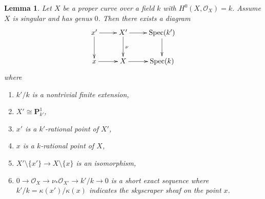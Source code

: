 \documentclass{stacks-project}
\theoremstyle{plain}
\newtheorem{lemma}[subsection]{Lemma}
\theoremstyle{definition}
\theoremstyle{remark}
\numberwithin{equation}{subsection}
\def\Spec{\mathop{\mathrm{Spec}}}
\begin{document}
\begin{lemma}
\label{lemma-genus-zero-singular}
Let $X$ be a proper curve over a field $k$ with $H^0(X, \mathcal{O}_X) = k$.
Assume $X$ is singular and has genus $0$. Then there exists a diagram
$$
\xymatrix{
x' \ar[d] \ar[r] & X' \ar[d]^\nu \ar[r] & \Spec(k') \ar[d] \\
x \ar[r] & X \ar[r] & \Spec(k)
}
$$
where
\begin{enumerate}
\item $k'/k$ is a nontrivial finite extension,
\item $X' \cong \mathbf{P}^1_{k'}$,
\item $x'$ is a $k'$-rational point of $X'$,
\item $x$ is a $k$-rational point of $X$,
\item $X' \setminus \{x'\} \to X \setminus \{x\}$ is an isomorphism,
\item $0 \to \mathcal{O}_X \to \nu_*\mathcal{O}_{X'} \to k'/k \to 0$
is a short exact sequence
where $k'/k = \kappa(x')/\kappa(x)$ indicates the skyscraper sheaf
on the point $x$.
\end{enumerate}
\end{lemma}
\end{document}
